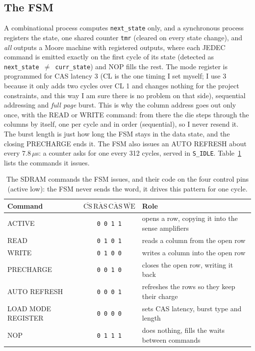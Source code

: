 \documentclass[a4paper,10pt]{article}
\begin{document}
\subsection{The FSM}

A combinational process
computes \texttt{next\_state} only, and a synchronous process registers the state,
one shared counter \texttt{tmr} (cleared on every state change), and \emph{all}
outputs a Moore machine with registered outputs, where each JEDEC command is
emitted exactly on the first cycle of its state (detected as
\texttt{next\_state\,$\neq$\,curr\_state}) and NOP fills the rest. The mode register is
programmed for CAS latency 3 (CL is the one timing I set myself; I use 3 because it only
adds two cycles over CL 1 and changes nothing for the project constraints, and this way I am sure there is no
problem on that side), sequential addressing and \emph{full page} burst. This is why the
column address goes out only once, with the READ or WRITE command: from there the die
steps through the columns by itself, one per cycle and in order (sequential), so I never
resend it. The burst length is just how long the FSM stays in the data state, and the
closing PRECHARGE ends it. The FSM also issues an AUTO
REFRESH about every $7.8\,\mu$s: a counter asks for one every 312 cycles, served in
\texttt{S\_IDLE}. Table~\ref{tab:sdram-cmd} lists the commands it issues.

\begin{table}[H]
\centering
\caption{The SDRAM commands the FSM issues, and their code on the four control pins
(active low): the FSM never sends the word, it drives this pattern for one cycle.}
\label{tab:sdram-cmd}
\small
\begin{tabular}{l c l}
\toprule
\textbf{Command} & \textbf{$\overline{\mathrm{CS}}\,\overline{\mathrm{RAS}}\,\overline{\mathrm{CAS}}\,\overline{\mathrm{WE}}$} & \textbf{Role} \\
\midrule
ACTIVE             & \texttt{0 0 1 1} & opens a row, copying it into the sense amplifiers \\
READ               & \texttt{0 1 0 1} & reads a column from the open row \\
WRITE              & \texttt{0 1 0 0} & writes a column into the open row \\
PRECHARGE          & \texttt{0 0 1 0} & closes the open row, writing it back \\
AUTO REFRESH       & \texttt{0 0 0 1} & refreshes the rows so they keep their charge \\
LOAD MODE REGISTER & \texttt{0 0 0 0} & sets CAS latency, burst type and length \\
NOP                & \texttt{0 1 1 1} & does nothing, fills the waits between commands \\
\bottomrule
\end{tabular}
\end{table}
\end{document}
